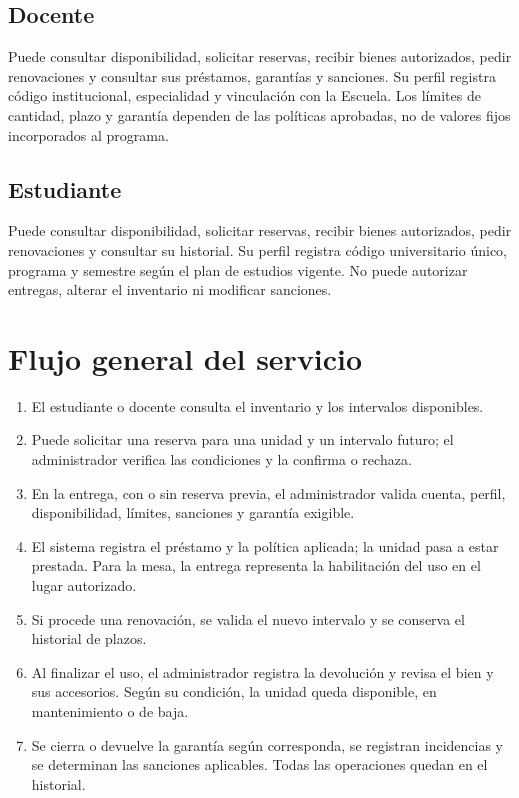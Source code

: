 \subsection{Docente}

Puede consultar disponibilidad, solicitar reservas, recibir bienes autorizados, pedir renovaciones y consultar sus pr\'estamos, garant\'ias y sanciones. Su perfil registra c\'odigo institucional, especialidad y vinculaci\'on con la Escuela. Los l\'imites de cantidad, plazo y garant\'ia dependen de las pol\'iticas aprobadas, no de valores fijos incorporados al programa.

\subsection{Estudiante}

Puede consultar disponibilidad, solicitar reservas, recibir bienes autorizados, pedir renovaciones y consultar su historial. Su perfil registra c\'odigo universitario \'unico, programa y semestre seg\'un el plan de estudios vigente. No puede autorizar entregas, alterar el inventario ni modificar sanciones.

\section{Flujo general del servicio}

\begin{enumerate}
    \item El estudiante o docente consulta el inventario y los intervalos disponibles.
    \item Puede solicitar una reserva para una unidad y un intervalo futuro; el administrador verifica las condiciones y la confirma o rechaza.
    \item En la entrega, con o sin reserva previa, el administrador valida cuenta, perfil, disponibilidad, l\'imites, sanciones y garant\'ia exigible.
    \item El sistema registra el pr\'estamo y la pol\'itica aplicada; la unidad pasa a estar prestada. Para la mesa, la entrega representa la habilitaci\'on del uso en el lugar autorizado.
    \item Si procede una renovaci\'on, se valida el nuevo intervalo y se conserva el historial de plazos.
    \item Al finalizar el uso, el administrador registra la devoluci\'on y revisa el bien y sus accesorios. Seg\'un su condici\'on, la unidad queda disponible, en mantenimiento o de baja.
    \item Se cierra o devuelve la garant\'ia seg\'un corresponda, se registran incidencias y se determinan las sanciones aplicables. Todas las operaciones quedan en el historial.
\end{enumerate}

